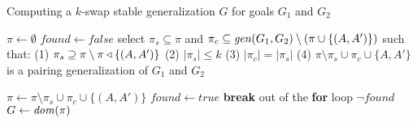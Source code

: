 \begin{algorithm}[hbtp]
	\caption{Computing a $k$-swap stable generalization $G$ for goals $G_1$ and $G_2$}
	\label{alg:kswap}
	\begin{algorithmic}
		\State $\pi\gets\emptyset$
		\Repeat
			\State $found\gets false$
				\State select $\pi_s \subseteq \pi$ and $\pi_c\subseteq \mathit{gen}(G_1, G_2)\setminus(\pi \cup\{(A,A')\})$ such that:
				\State \hspace*{3ex}(1) $\pi_s\supseteq \pi\setminus \pi\triangleleft\{(A,A')\}$
				\State \hspace*{3ex}(2) $|\pi_s| \le k$
				\State \hspace*{3ex}(3) $|\pi_c| = |\pi_s|$
				\State \hspace*{3ex}(4) $\pi\setminus \pi_s\cup \pi_c\cup\{A,A'\}$ is a pairing generalization of $G_1$ and $G_2$
				
					\State $\pi\gets \pi\setminus \pi_s\cup \pi_c \cup \{(A,A')\}$
					\State $found\gets true$
					\State \textbf{break} out of the \textbf{for} loop
				\EndIf
			\EndFor
		\Until $\neg found$
		\State $G \gets \mathit{dom}(\pi)$
	\end{algorithmic}
\end{algorithm}	


